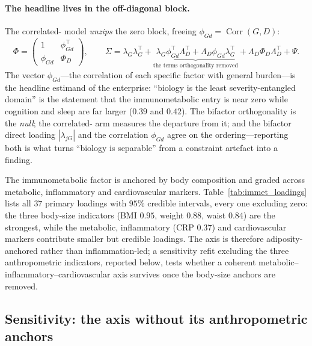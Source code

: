 \paragraph{The headline lives in the off-diagonal block.} The correlated-\Gfac{} model
\emph{unzips} the zero block, freeing $\phi_{Gd}=\operatorname{Corr}(G,D)$:
\begin{equation}
  \Phi=\begin{pmatrix}1&\phi_{Gd}^{\top}\\[1pt] \phi_{Gd}&\Phi_D\end{pmatrix},\qquad
  \Sigma=\lambda_G\lambda_G^{\top}
  +\underbrace{\lambda_G\phi_{Gd}^{\top}\Lambda_D^{\top}+\Lambda_D\phi_{Gd}\lambda_G^{\top}}_{\text{the terms orthogonality removed}}
  +\Lambda_D\Phi_D\Lambda_D^{\top}+\Psi .
  \label{eqA:corrG}
\end{equation}
The vector $\phi_{Gd}$---the correlation of each specific factor with general
burden---is the headline estimand of the enterprise: ``biology is the least
severity-entangled domain'' is the statement that the immunometabolic entry is near zero
while cognition and sleep are far larger ($0.39$ and $0.42$). The bifactor orthogonality
is the \emph{null}; the correlated-\Gfac{} arm measures the departure from it; and the
bifactor direct loading $|\lambda_{jG}|$ and the correlation $\phi_{Gd}$ agree on the
ordering---reporting both is what turns ``biology is separable'' from a constraint
artefact into a finding.

The immunometabolic factor is anchored by body composition and graded across metabolic,
inflammatory and cardiovascular markers. Table~\ref{tab:immet_loadings} lists all $37$
primary loadings with $95\%$ credible intervals, every one excluding zero: the three
body-size indicators (BMI $0.95$, weight $0.88$, waist $0.84$) are the strongest, while the
metabolic, inflammatory (CRP $0.37$) and cardiovascular markers contribute smaller but
credible loadings. The axis is therefore adiposity-anchored rather than inflammation-led; a
sensitivity refit excluding the three anthropometric indicators, reported below, tests
whether a coherent metabolic--inflammatory--cardiovascular axis survives once the body-size
anchors are removed.



\subsection{Sensitivity: the axis without its anthropometric anchors}
\label{annA:nobmi}

